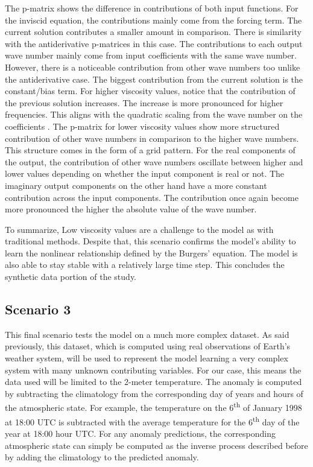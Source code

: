 The p-matrix shows the difference in contributions of both input functions. For the inviscid equation, the contributions mainly come from the forcing term. The current solution contributes a smaller amount in comparison. There is similarity with the antiderivative p-matrices in this case. The contributions to each output wave number mainly come from input coefficients with the same wave number. However, there is a noticeable contribution from other wave numbers too unlike the antiderivative case. The biggest contribution from the current solution is the constant/bias term. For higher viscosity values, notice that the contribution of the previous solution increases. The increase is more pronounced for higher frequencies. This aligns with the quadratic scaling from the wave number on the coefficients \autocite{canutoSpectralMethodsEvolution2007}. The p-matrix for lower viscosity values show more structured contribution of other wave numbers in comparison to the higher wave numbers. This structure comes in the form of a grid pattern. For the real components of the output, the contribution of other wave numbers oscillate between higher and lower values depending on whether the input component is real or not. The imaginary output components on the other hand have a more constant contribution across the input components. The contribution once again become more pronounced the higher the absolute value of the wave number.

To summarize, Low viscosity values are a challenge to the model as with traditional methods. Despite that, this scenario confirms the model's ability to learn the nonlinear relationship defined by the Burgers' equation. The model is also able to stay stable with a relatively large time step. This concludes the synthetic data portion of the study.

\subsection{Scenario 3}
\noindent This final scenario tests the model on a much more complex dataset. As said previously, this dataset, which is computed using real observations of Earth's weather system, will be used to represent the model learning a very complex system with many unknown contributing variables. For our case, this means the data used will be limited to the 2-meter temperature. The anomaly is computed by subtracting the climatology from the corresponding day of years and hours of the atmospheric state. For example, the temperature on the 6\textsuperscript{th} of January 1998 at 18:00 UTC is subtracted with the average temperature for the 6\textsuperscript{th} day of the year at 18:00 hour UTC\@. For any anomaly predictions, the corresponding atmospheric state can simply be computed as the inverse process described before by adding the climatology to the predicted anomaly.

